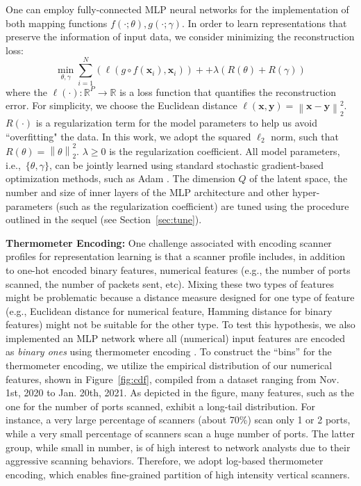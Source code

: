 \documentclass[manuscript, nonacm]{acmart}
\newcommand{\ie}{\mbox{{i.e.,\ }}}
\newcommand{\para}[1]{\vspace*{1ex}\noindent\textbf{#1} }
\newcommand{\bx}{\bm{x}}%
\newcommand{\Norm}[1]{\left\lVert#1\right\rVert}
\begin{document}
One can employ fully-connected MLP neural networks
for the implementation of both mapping functions $f(\cdot;\theta),g(\cdot;\gamma)$. In order to learn representations that preserve the information of input data, we consider minimizing the reconstruction loss:
\begin{equation}
    \min_{\theta,\gamma} \sum_{i=1}^N \left( \ell(g \circ f(\bx_i), \bx_i) \right) +  + \lambda (R(\theta)+R(\gamma))
\end{equation}
where the $\ell(\cdot): \mathbb{R}^P \rightarrow \mathbb{R}$ is a loss function that quantifies the reconstruction error. For simplicity, we choose the Euclidean distance $\ell(\bx,\bm{y})=\Norm{\bx-\bm{y}}_2^2$. 
$R(\cdot)$ is a regularization term for the model parameters
to help us avoid ``overfitting" the data.
In this work, we adopt the squared $\ell_2$ norm, such that $R(\theta)=\Norm{\theta}_2^2$. 
$\lambda \geq 0$ is the regularization coefficient.
All model parameters, \ie $\{\theta,\gamma\}$,
can be jointly learned using standard stochastic gradient-based optimization methods, 
such as Adam \cite{kingma2014adam}. 
The dimension $Q$ of the latent space, the number and size of inner layers of the MLP
architecture and other hyper-parameters (such as the regularization
coefficient) are tuned using the procedure outlined in the sequel (see Section~\ref{sec:tune}). 

\para{Thermometer Encoding:} One challenge associated with
encoding scanner profiles for representation learning is that a scanner profile includes, in addition to one-hot encoded binary features, numerical features (e.g., the number of ports scanned, the number of packets sent, etc). 
Mixing these two types of features might be problematic because a distance 
measure designed for one type of feature (e.g., Euclidean distance for numerical feature, 
Hamming distance for binary features) might not be suitable for the other type. To 
test this hypothesis, we also implemented an MLP network
where all (numerical) input features are encoded as \emph{binary ones} using
thermometer encoding \cite{thermometerEncoding}.
To construct the “bins” for 
the thermometer encoding, we utilize the empirical distribution of our numerical features,
shown in Figure~\ref{fig:cdf},
compiled from a dataset ranging from Nov. 1st, 2020 to Jan. 20th, 2021.
As depicted in the figure, many features, such as the one for the number of ports scanned,
exhibit a long-tail distribution.  For instance,
a very large percentage of scanners (about 70\%) scan only 1 or 2 ports, while a very small percentage of scanners scan a huge number of ports.  The latter group, while small in number, is of high interest to network analysts due to their aggressive scanning behaviors.  Therefore, we adopt log-based thermometer encoding, which enables fine-grained partition of high intensity vertical scanners.
\end{document}
